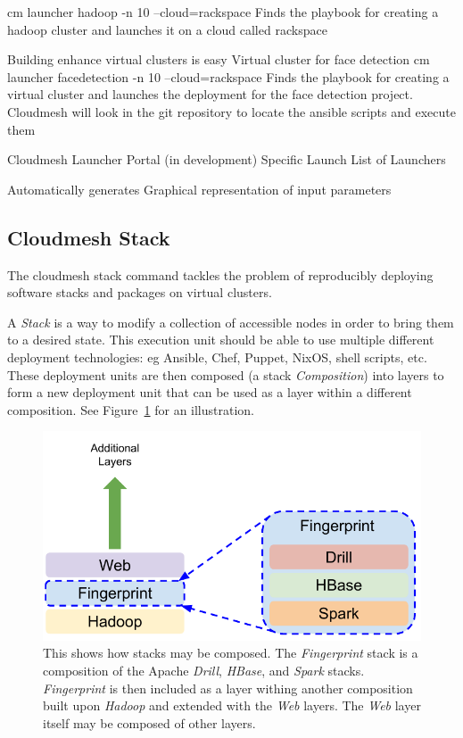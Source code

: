 cm launcher hadoop -n 10 --cloud=rackspace
Finds the playbook for creating a hadoop cluster and launches it on a cloud called rackspace



Building enhance virtual clusters is easy
Virtual cluster for face detection
cm launcher facedetection -n 10 --cloud=rackspace
Finds the playbook for creating a virtual cluster and launches the deployment for the face detection project.
Cloudmesh will look in the git repository to locate the ansible scripts and execute them


Cloudmesh Launcher Portal (in development)
       Specific Launch                                    List of Launchers





Automatically generates Graphical representation of input parameters                                  


\subsection{Cloudmesh Stack}
\label{S:stacks}

The cloudmesh stack command tackles the problem of reproducibly
deploying software stacks and packages on virtual clusters.

A \emph{Stack} is a way to modify a collection of accessible nodes in
order to bring them to a desired state. This execution unit should be
able to use multiple different deployment technologies: eg Ansible,
Chef, Puppet, NixOS, shell scripts, etc. These deployment units are
then composed (a stack \emph{Composition}) into layers to form a new
deployment unit that can be used as a layer within a different
composition. See Figure~\ref{F:stack-composition} for an illustration.


\begin{figure}
\centering
\includegraphics[width=1\columnwidth]{images/cloudmesh-stack-composition.pdf}
\caption{This shows how stacks may be composed. The
  \emph{Fingerprint} stack is a composition of the Apache
  \emph{Drill}, \emph{HBase}, and \emph{Spark}
  stacks. \emph{Fingerprint} is then included as a layer withing
  another composition built upon \emph{Hadoop} and extended with the
  \emph{Web} layers. The \emph{Web} layer itself may be composed
  of other layers.
  \label{F:stack-composition}}
\end{figure}


